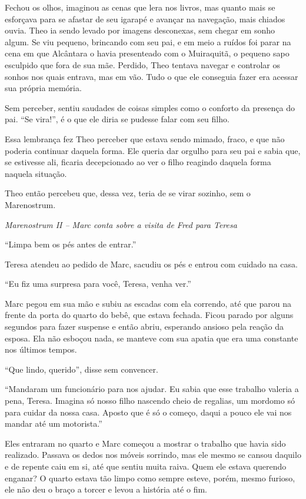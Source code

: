 Fechou os olhos, imaginou as cenas que lera nos livros, mas quanto mais
se esforçava para se afastar de seu igarapé e avançar na navegação, mais
chiados ouvia. Theo ia sendo levado por imagens desconexas, sem chegar
em sonho algum. Se viu pequeno, brincando com seu pai, e em meio a
ruídos foi parar na cena em que Alcântara o havia presenteado com o
Muiraquitã, o pequeno sapo esculpido que fora de sua mãe. Perdido, Theo
tentava navegar e controlar os sonhos nos quais entrava, mas em vão.
Tudo o que ele conseguia fazer era acessar sua própria memória.

Sem perceber, sentiu saudades de coisas simples como o conforto da
presença do pai. ``Se vira!'', é o que ele diria se pudesse falar com
seu filho.

Essa lembrança fez Theo perceber que estava sendo mimado, fraco, e que
não poderia continuar daquela forma. Ele queria dar orgulho para seu pai
e sabia que, se estivesse ali, ficaria decepcionado ao ver o filho
reagindo daquela forma naquela situação.

Theo então percebeu que, dessa vez, teria de se virar sozinho, sem o
Marenostrum.

\asterisc

\emph{Marenostrum II -- Marc conta sobre a visita de Fred para Teresa}

``Limpa bem os pés antes de entrar.''

Teresa atendeu ao pedido de Marc, sacudiu os pés e entrou com cuidado na
casa.

``Eu fiz uma surpresa para você, Teresa, venha ver.''

Marc pegou em sua mão e subiu as escadas com ela correndo, até que parou
na frente da porta do quarto do bebê, que estava fechada. Ficou parado
por alguns segundos para fazer suspense e então abriu, esperando ansioso
pela reação da esposa. Ela não esboçou nada, se manteve com sua apatia
que era uma constante nos últimos tempos.

``Que lindo, querido'', disse sem convencer.

``Mandaram um funcionário para nos ajudar. Eu sabia que esse trabalho
valeria a pena, Teresa. Imagina só nosso filho nascendo cheio de
regalias, um mordomo só para cuidar da nossa casa. Aposto que é só o
começo, daqui a pouco ele vai nos mandar até um motorista.''

Eles entraram no quarto e Marc começou a mostrar o trabalho que havia
sido realizado. Passava os dedos nos móveis sorrindo, mas ele mesmo se
cansou daquilo e de repente caiu em si, até que sentiu muita raiva. Quem
ele estava querendo enganar? O quarto estava tão limpo como sempre
esteve, porém, mesmo furioso, ele não deu o braço a torcer e levou a
história até o fim.

